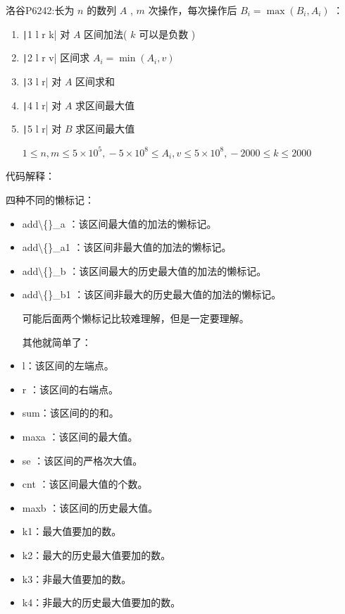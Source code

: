 \documentclass[twocolumn,10pt]{ctexart}
\begin{document}
\begin{notebox}
洛谷P6242:长为 $n$ 的数列 $A$ , $m$ 次操作，每次操作后 $B_i=\max(B_i,A_i)$ ：

\begin{enumerate}
\item \texttt|1 l r k| 对 $A$ 区间加法( $k$ 可以是负数 )
\item \texttt|2 l r v| 区间求 $A_i=\min(A_i,v)$
\item \texttt|3 l r| 对 $A$ 区间求和
\item \texttt|4 l r| 对 $A$ 求区间最大值
\item \texttt|5 l r| 对 $B$ 求区间最大值

$1\le n,\allowbreak{}m\le5\times10^5,\allowbreak{}-5\times10^8\le A_i,\allowbreak{}v\le5\times10^8,\allowbreak{}-2000\le k\le2000$
\end{enumerate}
\end{notebox}

代码解释：

四种不同的懒标记：

\begin{itemize}
\item add\textbackslash\{\}\_a ：该区间最大值的加法的懒标记。
\item add\textbackslash\{\}\_a1 ：该区间非最大值的加法的懒标记。
\item add\textbackslash\{\}\_b ：该区间最大的历史最大值的加法的懒标记。
\item add\textbackslash\{\}\_b1 ：该区间非最大的历史最大值的加法的懒标记。

可能后面两个懒标记比较难理解，但是一定要理解。

其他就简单了：
\end{itemize}

\begin{itemize}
\item l：该区间的左端点。
\item r ：该区间的右端点。
\item sum：该区间的的和。
\item maxa ：该区间的最大值。
\item se ：该区间的严格次大值。
\item cnt ：该区间最大值的个数。
\item maxb ：该区间的历史最大值。
\end{itemize}

\begin{itemize}
\item k1：最大值要加的数。
\item k2：最大的历史最大值要加的数。
\item k3：非最大值要加的数。
\item k4：非最大的历史最大值要加的数。
\end{itemize}
\end{document}
